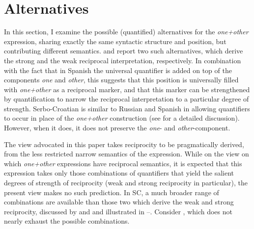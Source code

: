 \documentclass[output=paper,colorlinks,citecolor=brown]{langscibook}
\begin{document}
\section{Alternatives}\label{sec:4}
\begin{sloppypar}
In this section, I examine the possible (quantified) alternatives for the \textit{one+other} expression, sharing exactly the same syntactic structure and position, but contributing different semantics. \citet{v10} and \citet{z14} report two such alternatives, which derive the strong and the weak reciprocal interpretation, respectively. In combination with the fact that in Spanish the universal quantifier is added on top of the components \textit{one} and \textit{other}, this suggests that this position is universally filled with \textit{one+other} as a reciprocal marker, and that this marker can be strengthened by quantification to narrow the reciprocal interpretation to a particular degree of strength. Serbo-Croatian is similar to Russian and Spanish in allowing quantifiers to occur in place of the \textit{one+other} construction (see \citealt{m14, m16} for a detailed discussion). However, when it does, it does not preserve the \textit{one}- and \textit{other}-component. 
\end{sloppypar}

The view advocated in this paper takes reciprocity to be pragmatically derived, from the less restricted narrow semantics of the expression. While on the view on which \textit{one+other} expressions have reciprocal semantics, it is expected that this expression takes only those combinations of quantifiers that yield the salient degrees of strength of reciprocity (weak and strong reciprocity in particular), the present view makes no such prediction. In SC, a much broader range of combinations are available than those two which derive the weak and strong reciprocity, discussed by \citet{v10} and \citet{z14} and illustrated in --. Consider , which does not nearly exhaust the possible combinations.
\end{document}
